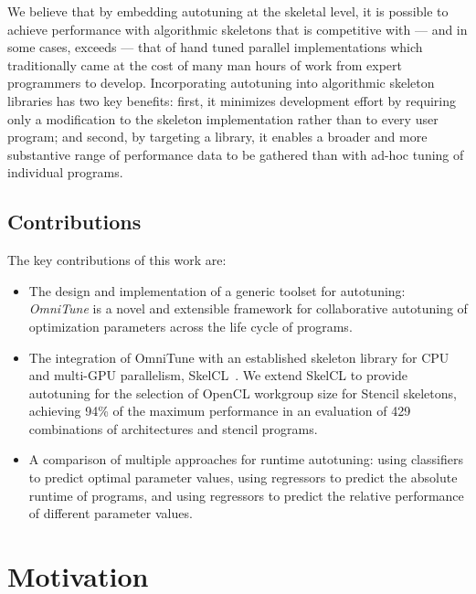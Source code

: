 We believe that by embedding autotuning at the skeletal level, it is
possible to achieve performance with algorithmic skeletons that is
competitive with --- and in some cases, exceeds --- that of hand tuned
parallel implementations which traditionally came at the cost of many
man hours of work from expert programmers to develop. Incorporating
autotuning into algorithmic skeleton libraries has two key benefits:
first, it minimizes development effort by requiring only a
modification to the skeleton implementation rather than to every user
program; and second, by targeting a library, it enables a broader and
more substantive range of performance data to be gathered than with
ad-hoc tuning of individual programs.


\subsection{Contributions}

The key contributions of this work are:

\begin{itemize}
\item The design and implementation of a generic toolset for
  autotuning: \emph{OmniTune} is a novel and extensible framework for
  collaborative autotuning of optimization parameters across the life
  cycle of programs.
\item The integration of OmniTune with an established skeleton library
  for CPU and multi-GPU parallelism, SkelCL~\cite{Steuwer2011}. We
  extend SkelCL to provide autotuning for the selection of OpenCL
  workgroup size for Stencil skeletons, achieving 94\% of the maximum
  performance in an evaluation of 429 combinations of architectures
  and stencil programs.
\item A comparison of multiple approaches for runtime autotuning:
  using classifiers to predict optimal parameter values, using
  regressors to predict the absolute runtime of programs, and using
  regressors to predict the relative performance of different
  parameter values.
\end{itemize}

\section{Motivation}

